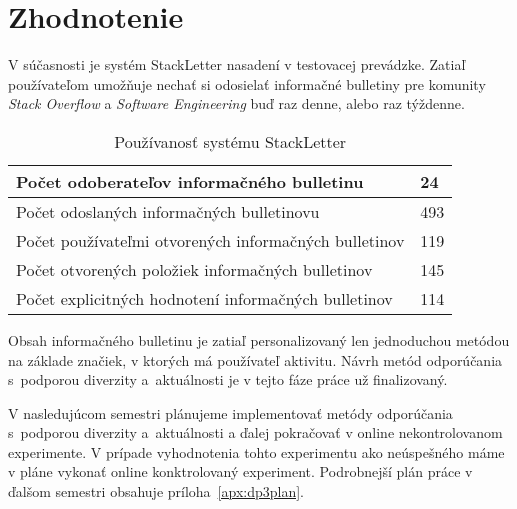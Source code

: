 \newpage

\chapter{Zhodnotenie}

V súčasnosti je systém StackLetter nasadení v testovacej prevádzke. Zatiaľ používateľom umožňuje nechať si odosielať
informačné bulletiny pre komunity \textit{Stack Overflow} a \textit{Software Engineering} buď raz denne, alebo raz týždenne.

\begin{table}[h]
\centering
\caption{Používanosť systému StackLetter}
\begin{tabular}{|m{10cm}|m{1.5cm}|}
\hline
Počet odoberateľov informačného bulletinu & 24 \\ \hline
Počet odoslaných informačných bulletinovu & 493 \\ \hline
Počet používateľmi otvorených informačných bulletinov & 119\footnotemark \\ \hline
Počet otvorených položiek informačných bulletinov & 145 \\ \hline
Počet explicitných hodnotení informačných bulletinov & 114 \\ \hline
\end{tabular}
\end{table}


Obsah informačného bulletinu je zatiaľ personalizovaný len jednoduchou metódou na základe značiek, v ktorých má používateľ aktivitu.
Návrh metód odporúčania s~podporou diverzity a~aktuálnosti je v tejto fáze práce už finalizovaný.

V nasledujúcom semestri plánujeme implementovať metódy odporúčania s~podporou diverzity a~aktuálnosti a ďalej pokračovať
v online nekontrolovanom experimente. V prípade vyhodnotenia tohto experimentu ako neúspešného máme v pláne vykonať
online konktrolovaný experiment. Podrobnejší plán práce v ďalšom semestri obsahuje príloha~\ref{apx:dp3plan}.
